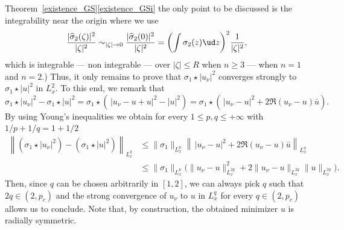 \begin{ProofOf}{Theorem~\ref{existence_GS}\eqref{existence_GSi}}
the only point to be discussed is the integrability near the origin where we use
\[
\frac{|\widehat{\sigma}_{2}(\zeta)|^2}{|\zeta|^2}\sim_{|\zeta|\to 0} \frac{|\widehat{\sigma}_{2}(0)|^2}{|\zeta|^2}
=\biggl(\int \sigma_2(z)\ud z\biggr)^2\frac{1}{|\zeta|^2},
\]
which is integrable --- \resp non integrable --- over $|\zeta|\leq R$ when $n\geq 3$ --- \resp when $n=1$ and $n=2$.)
Thus, it only remains to prove that $\sigma_{1}\star|u_{\nu}|^{2}$ converges strongly to $\sigma_{1}\star|u|^{2}$ in $L_{x}^{2}$. To this end, we remark that
\[
\sigma_{1}\star|u_{\nu}|^{2}-\sigma_{1}\star|u|^{2}=\sigma_{1}\star\left(\,|u_{\nu}-u+u|^{2}-|u|^{2}\right)=\sigma_{1}\star\left(\,|u_{\nu}-u|^{2}+2\Re (u_{\nu}-u)\bar{u}\right).
\]
By using Young's inequalities \cite[Th.\,4.2]{LL} we obtain for every $1\leq p,q\leq+\infty$ with $1/p+1/q=1+1/2$
\begin{align*}
\left\|(\sigma_{1}\star|u_{\nu}|^{2})-(\sigma_{1}\star|u|^{2})\right\|_{L_{x}^{2}}&\leq\|\sigma_{1}\|_{L_{x}^{p}}\left\|\,|u_{\nu}-u|^{2}+2\Re (u_{\nu}-u)\bar{u}\right\|_{L_{x}^{q}}\\
&\leq\|\sigma_{1}\|_{L_{x}^{p}}\bigl(\|u_{\nu}-u\|_{L_{x}^{2q}}^{2}+2\|u_{\nu}-u\|_{L_{x}^{2q}}\|u\|_{L_{x}^{2q}}\bigr).
\end{align*}
Then, since $q$ can be chosen arbitrarily in $[1,2]$, we can always pick $q$ such that $2q\in(2,p_{c})$ and the strong convergence of $u_{\nu}$ to $u$ in $L_{x}^{q}$ for every $q\in(2,p_{c})$ allows us to conclude.
Note that, by construction, the obtained minimizer $u$ is radially symmetric.
\end{ProofOf}

